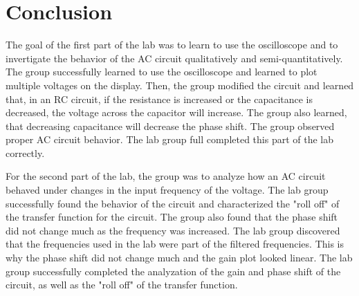 \documentclass[twocolumn, amsmath]{revtex4}
\begin{document}
\section{Conclusion}
The goal of the first part of the lab was to learn to use the oscilloscope and to invertigate the behavior of the AC circuit qualitatively and semi-quantitatively. The group successfully learned to use the oscilloscope and learned to plot multiple voltages on the display. Then, the group modified the circuit and learned that, in an RC circuit, if the resistance is increased or the capacitance is decreased, the voltage across the capacitor will increase. The group also learned, that decreasing capacitance will decrease the phase shift. The group observed proper AC circuit behavior. The lab group full completed this part of the lab correctly.

For the second part of the lab, the group was to analyze how an AC circuit behaved under changes in the input frequency of the voltage. The lab group successfully found the behavior of the circuit and characterized the "roll off" of the transfer function for the circuit. The group also found that the phase shift did not change much as the frequency was increased. The lab group discovered that the frequencies used in the lab were part of the filtered frequencies. This is why the phase shift did not change much and the gain plot looked linear. The lab group successfully completed the analyzation of the gain and phase shift of the circuit, as well as the "roll off" of the transfer function.
\end{document}

